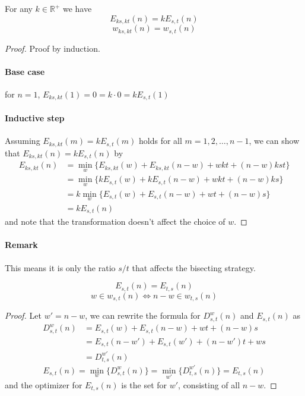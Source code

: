 \documentclass[]{article}
\begin{document}
\vspace{1cm}
\begin{lemma}[Homogeneity] For any $k\in\mathbb{R}^+$ we have
\[
	E_{ks,kt}(n) = k E_{s,t}(n)
\]
\[
	w_{ks,kt}(n) = w_{s,t}(n)
\]
\end{lemma}
\begin{proof}
		Proof by induction.
	\paragraph{Base case} for $n = 1$, $E_{ks,kt}(1) = 0 = k\cdot0 = kE_{s,t}(1)$
	\paragraph{Inductive step} Assuming $E_{ks,kt}(m) = k E_{s,t}(m)$ holds for all $m = 1,2,\dots,n-1$, we can show that $E_{ks,kt}(n) = k E_{s,t}(n)$ by
	\begin{align*}
	E_{ks,kt}(n) &= \min_{w}\{E_{ks,kt}(w) + E_{ks,kt}(n-w) + wkt +(n-w)kst\}\\
	  &= \min_{w}\{k E_{s,t}(w) + k E_{s,t}(n-w) + wkt +(n-w)ks\}\\
	  &= k\min_{w}\{E_{s,t}(w) + E_{s,t}(n-w) + wt +(n-w)s\}\\
	  &=kE_{s,t}(n)
	\end{align*}
	and note that the transformation doesn't affect the choice of $w$.
\end{proof}
\paragraph{Remark}
This means it is only the ratio $s/t$ that affects the bisecting strategy.


\vspace{1cm}
\begin{lemma}[Symmetry]
	\[
		E_{s,t}(n) = E_{t,s}(n)
	\]
	\[
		w \in w_{s,t}(n) \iff n-w \in w_{t,s}(n)
	\]
\end{lemma}
\begin{proof}
	Let $w' = n - w$, we can rewrite the formula for $D^w_{s,t}(n)$ and $E_{s,t}(n)$ as
	\begin{align*}
	D^w_{s,t}(n) &= E_{s,t}(w) + E_{s,t}(n-w) + wt +(n-w)s\\
	&= E_{s,t}(n-w') + E_{s,t}(w') + (n-w')t +ws\\
	&=D^{w'}_{t,s}(n)
	\end{align*}
	\[
	E_{s,t}(n) = \min_w\{D^w_{s,t}(n)\} = \min_{w'}\{D^{w'}_{t,s}(n)\} = E_{t,s}(n)
	\]
	and the optimizer for $E_{t,s}(n)$ is the set for $w'$, consisting of all $n-w$.
\end{proof}
\end{document}

